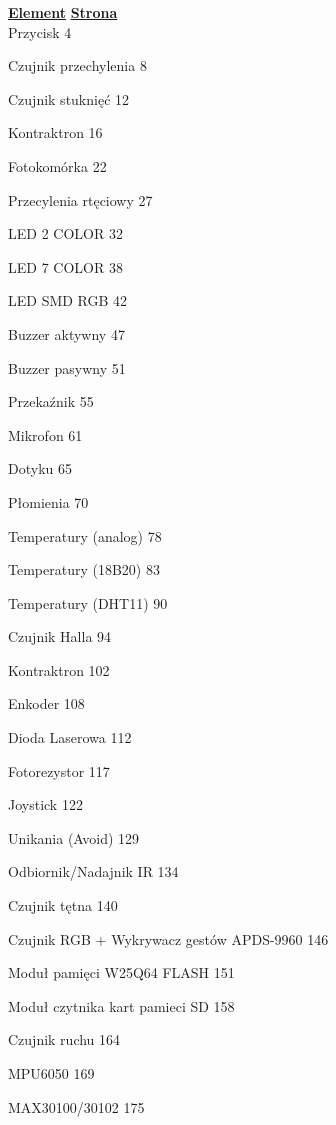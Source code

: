 \documentclass[11pt, a4paper]{article}
\begin{document}
%
%
\mainpagenoimage

\newpage

\tableofcontents

\pagestyle{empty}

\textbf{\underline{Element}}
\hfill
\textbf{\underline{Strona}} \\

Przycisk
\hfill
4

Czujnik przechylenia
\hfill
8

Czujnik stuknięć
\hfill
12

Kontraktron
\hfill
16

Fotokomórka
\hfill
22

Przecylenia rtęciowy
\hfill
27

LED 2 COLOR
\hfill
32

LED 7 COLOR
\hfill
38

LED SMD RGB
\hfill
42

Buzzer aktywny
\hfill
47

Buzzer pasywny
\hfill
51

Przekaźnik
\hfill
55

Mikrofon
\hfill
61

Dotyku
\hfill
65

Płomienia
\hfill
70

Temperatury (analog)
\hfill
78

Temperatury (18B20)
\hfill
83

Temperatury (DHT11)
\hfill
90

Czujnik Halla
\hfill
94

Kontraktron
\hfill
102

Enkoder
\hfill
108

Dioda Laserowa
\hfill
112

Fotorezystor
\hfill
117

Joystick
\hfill
122

Unikania (Avoid)
\hfill
129

Odbiornik/Nadajnik IR
\hfill
134

Czujnik tętna
\hfill
140

Czujnik RGB + Wykrywacz gestów APDS-9960
\hfill
146

Moduł pamięci W25Q64 FLASH
\hfill
151

Moduł czytnika kart pamieci SD
\hfill
158

Czujnik ruchu
\hfill
164

MPU6050
\hfill
169

MAX30100/30102
\hfill
175
\end{document}
